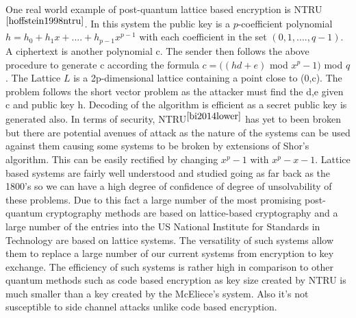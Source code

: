 \documentclass[10pt,a4paper]{IEEEtran}
\begin{document}
\newline
\newline
One real world example of post-quantum lattice based encryption is NTRU\(^{\cite{hoffstein1998ntru}}\). In this system the public key is a \(p\)-coefficient polynomial \( h = h_0 +h_1x+....+h_{p-1}x^{p-1} \) with each coefficient in the set \((0,1,....,q-1)\). A ciphertext is another polynomial c. The sender then follows the above procedure to generate c according the formula \(c =  ((hd + e) \) mod \(x^p-1)\) mod \( q\). The Lattice \(L\) is a 2p-dimensional lattice containing a point close to (0,c). The problem follows the short vector problem as the attacker must find the d,e given c and public key h. Decoding of the algorithm is efficient as a secret public key is generated also.
\newline
In terms of security, NTRU\(^{\cite{bi2014lower}}\) has yet to been broken but there are potential avenues of attack as the nature of the systems can be used against them causing some systems to be broken by extensions of Shor's algorithm. This can be easily rectified by changing \(x^p-1\) with \(x^p-x-1\).
\newline
Lattice based systems are fairly well understood and studied going as far back as the 1800's so we can have a high degree of confidence of degree of unsolvability of these problems. Due to this fact a large number of the most promising post-quantum cryptography methods are based on lattice-based cryptography and a large number of the entries into the US National Institute for Standards in Technology are based on lattice systems. The versatility of such systems allow them to replace a large number of our current systems from encryption to key exchange. The efficiency of such systems is rather high in comparison to other quantum methods such as code based encryption as key size created by NTRU is much smaller than a key created by the McEliece's system. Also it's not susceptible to side channel attacks unlike code based encryption.
\end{document}
